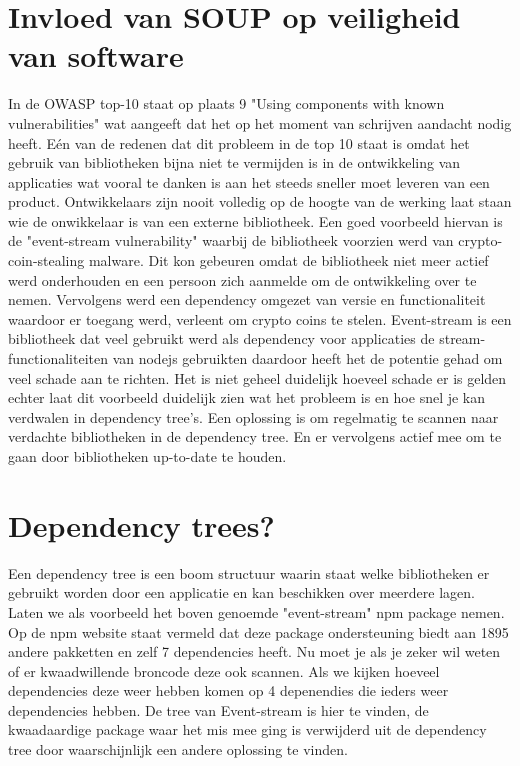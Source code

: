 \section{Invloed van SOUP op veiligheid van software}\label{sec:invloed-van-soup-op-veiligheid-van-software}
In de OWASP top-10 staat op plaats 9 "Using components with known vulnerabilities" wat aangeeft dat het op het moment van schrijven aandacht nodig heeft.
Eén van de redenen dat dit probleem in de top 10 staat is omdat het gebruik van bibliotheken bijna niet te vermijden is in de ontwikkeling van applicaties wat vooral te danken is aan het steeds sneller moet leveren van een product.
Ontwikkelaars zijn nooit volledig op de hoogte van de werking laat staan wie de onwikkelaar is van een externe bibliotheek.
Een goed voorbeeld hiervan is de "event-stream vulnerability" waarbij de bibliotheek voorzien werd van crypto-coin-stealing malware.
Dit kon gebeuren omdat de bibliotheek niet meer actief werd onderhouden en een persoon zich aanmelde om de ontwikkeling over te nemen.
Vervolgens werd een dependency omgezet van versie en functionaliteit waardoor er toegang werd, verleent om crypto coins te stelen.
Event-stream is een bibliotheek dat veel gebruikt werd als dependency voor applicaties de stream-functionaliteiten van nodejs gebruikten daardoor heeft het de potentie gehad om veel schade aan te richten.
Het is niet geheel duidelijk hoeveel schade er is gelden echter laat dit voorbeeld duidelijk zien wat het probleem is en hoe snel je kan verdwalen in dependency tree's.
Een oplossing is om regelmatig te scannen naar verdachte bibliotheken in de dependency tree.
En er vervolgens actief mee om te gaan door bibliotheken up-to-date te houden.

\section{Dependency trees?}\label{sec:dependency-trees?}
Een dependency tree is een boom structuur waarin staat welke bibliotheken er gebruikt worden door een applicatie en kan beschikken over meerdere lagen.
Laten we als voorbeeld het boven genoemde "event-stream" npm package nemen.
Op de npm website staat vermeld dat deze package ondersteuning biedt aan 1895 andere pakketten en zelf 7 dependencies heeft.
Nu moet je als je zeker wil weten of er kwaadwillende broncode deze ook scannen. 
Als we kijken hoeveel dependencies deze weer hebben komen op 4 depenendies die ieders weer dependencies hebben.
De tree van Event-stream is hier te vinden, de kwaadaardige package waar het mis mee ging is verwijderd uit de dependency tree door waarschijnlijk een andere oplossing te vinden.

